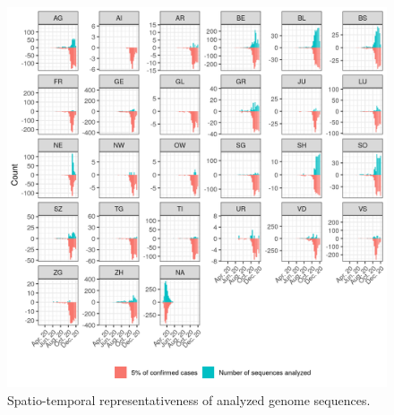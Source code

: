 \documentclass[9pt,twoside,lineno]{pnas-new}
\begin{document}
\begin{figure}
\centering
\includegraphics[width = 11.4cm]{figures/swiss_downsampling.png}
\caption{Spatio-temporal representativeness of analyzed genome sequences.}  
\label{fig:downsampling_representativeness}
\end{figure}










% 
\end{document}

